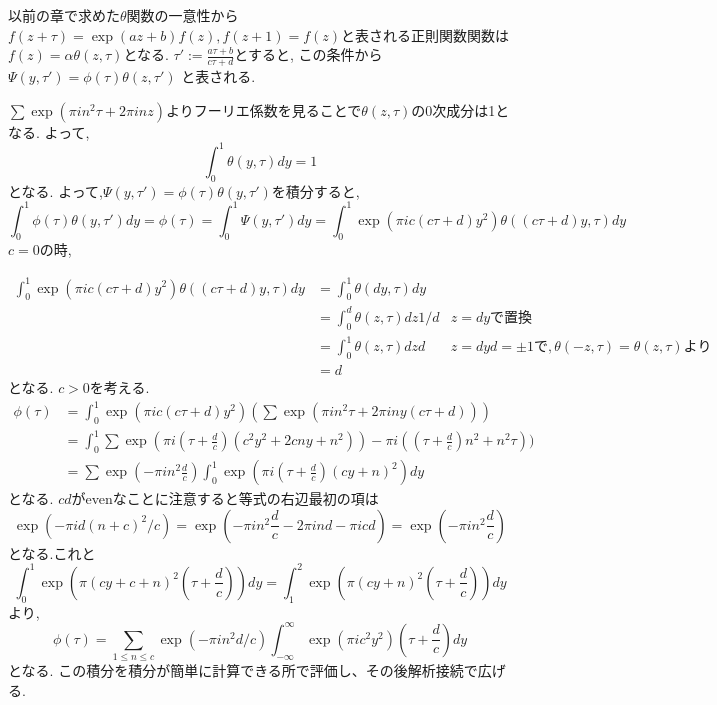 以前の章で求めた$\theta$関数の一意性から$f(z + \tau)=\exp(az + b)f(z), f(z+1) = f(z)$と表される正則関数関数は
$f(z) = \alpha \theta(z, \tau)$となる.
$\tau' := \frac{a \tau + b}{c \tau + d}$とすると,
この条件から$\Psi(y, \tau') = \phi(\tau) \theta(z, \tau')$
と表される.

$\sum \exp(\pi i n^2 \tau + 2\pi in z)$よりフーリエ係数を見ることで$\theta(z, \tau)$の0次成分は1となる.
よって,
\begin{equation*}
\int_0^1 \theta(y, \tau) dy = 1
\end{equation*}
となる.
よって,$\Psi(y, \tau') = \phi(\tau) \theta(y, \tau')$を積分すると,
\begin{equation*}
    \int_0^1 \phi(\tau) \theta(y, \tau') dy = \phi(\tau) = \int_0^1 \Psi(y, \tau')dy = \int_0^1 \exp(\pi ic (c \tau +d)y^2) \theta((c \tau +d)y, \tau)dy
\end{equation*}
$c =0$の時,

\begin{align*}
\int_0^1 \exp(\pi ic (c \tau +d)y^2) \theta((c \tau +d)y, \tau)dy
& =  \int_0^1 \theta(dy, \tau)dy \\
& =  \int_0^{d} \theta(z, \tau)dz 1/d  & z = dy \mbox{で置換}\\
& =  \int_0^{1} \theta(z, \tau)dz d  & z = dy d = \pm 1 \mbox{で}, \theta(-z, \tau) = \theta(z, \tau)より\\
& = d
\end{align*}
となる. $c > 0$を考える.
\begin{align*}
\phi(\tau)
& = \int_0^1 \exp(\pi i c  (c\tau + d)y^2)(\sum \exp(\pi i n^2 \tau  + 2\pi in y(c \tau + d))) \\
& = \int_0^1 \sum \exp(\pi i (\tau + \frac{d}{c}) (c^2y^2 + 2cny  + n^2)) - \pi i((\tau + \frac{d}{c})n^2 +  n^2 \tau)) \\
& = \sum \exp(-\pi i n^2 \frac{d}{c}) \int_0^1\exp(\pi i (\tau + \frac{d}{c})(cy + n)^2) dy
\end{align*}
となる.
$cd$がevenなことに注意すると等式の右辺最初の項は
\begin{equation*}
\exp(- \pi i d (n+c)^2 / c) = \exp(-\pi i n^2 \frac{d}{c} - 2\pi ind - \pi i cd) = \exp(-\pi i n^2 \frac{d}{c})
\end{equation*}
となる.これと
\begin{equation*}
\int_0^1 \exp(\pi (cy + c + n)^2 (\tau  + \frac{d}{c})) dy
= \int_1^2 \exp(\pi (cy  + n)^2 (\tau  + \frac{d}{c})) dy
\end{equation*}
より,
\begin{equation*}
 \phi(\tau)  = \sum_{1\le n \le c} \exp(-\pi i n^2 d/c)\int_{- \infty}^{\infty}\exp(\pi i c^2y^2)(\tau + \frac{d}{c})dy
\end{equation*}
となる.
この積分を積分が簡単に計算できる所で評価し、その後解析接続で広げる.

